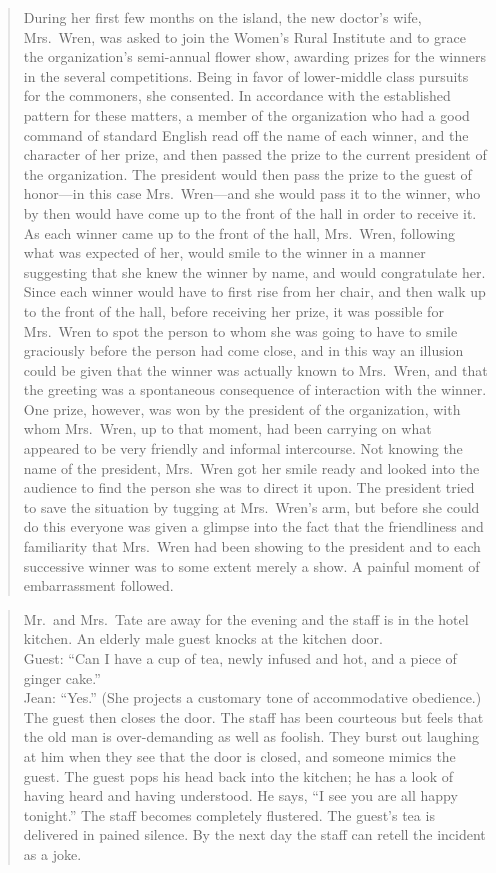 \documentclass[twoside,symmetric,nobib,justified]{tufte-book}
\begin{document}
\begin{quote}
During her first few months on the island, the new doctor's wife,
Mrs.~Wren, was asked to join the Women's Rural Institute and to grace
the organization's semi-annual flower show, awarding prizes for the
winners in the several competitions. Being in favor of lower-middle
class pursuits for the commoners, she consented. In accordance with the
established pattern for these matters, a member of the organization who
had a good command of standard English read off the name of each winner,
and the character of her prize, and then passed the prize to the current
president of the organization. The president would then pass the prize
to the guest of honor---in this case Mrs.~Wren---and she would pass it
to the winner, who by then would have come up to the front of the hall
in order to receive it. As each winner came up to the front of the hall,
Mrs.~Wren, following what was expected of her, would smile to the winner
in a manner suggesting that she knew the winner by name, and would
congratulate her. Since each winner would have to first rise from her
chair, and then walk up to the front of the hall, before receiving her
prize, it was possible for Mrs.~Wren to spot the person to whom she was
going to have to smile graciously before the person had come close, and
in this way an illusion could be given that the winner was actually
known to Mrs.~Wren, and that the greeting was a spontaneous consequence
of interaction with the winner. One prize, however, was won by the
president of the organization, with whom Mrs.~Wren, up to that moment,
had been carrying on what appeared to be very friendly and informal
intercourse. Not knowing the name of the president, Mrs.~Wren got her
smile ready and looked into the audience to find the person she was to
direct it upon. The president tried to save the situation by tugging at
Mrs.~Wren's arm, but before she could do this everyone was given a
glimpse into the fact that the friendliness and familiarity that
Mrs.~Wren had been showing to the president and to each successive
winner was to some extent merely a show. A painful moment of
embarrassment followed.
\end{quote}

\begin{quote}
Mr.~and Mrs.~Tate are away for the evening and the staff is in the hotel
kitchen. An elderly male guest knocks at the kitchen door.\\
Guest: ``Can I have a cup of tea, newly infused and hot, and a piece of
ginger cake.''\\
Jean: ``Yes.'' (She projects a customary tone of accommodative
obedience.)\\
The guest then closes the door. The staff has been courteous but feels
that the old man is over-demanding as well as foolish. They burst out
laughing at him when they see that the door is closed, and someone
mimics the guest. The guest pops his head back into the kitchen; he has
a look of having heard and having understood. He says, ``I see you are
all happy tonight.'' The staff becomes completely flustered. The guest's
tea is delivered in pained silence. By the next day the staff can retell
the incident as a joke.
\end{quote}
\end{document}
